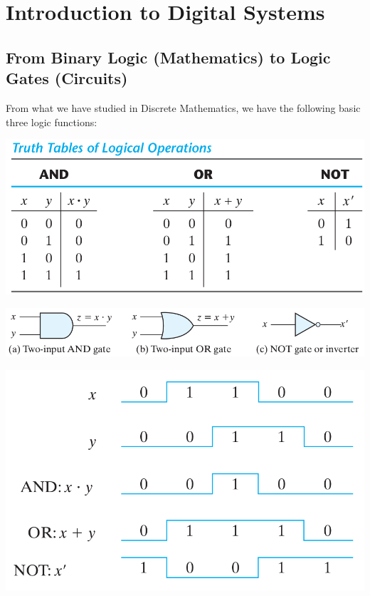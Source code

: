 \chapter{Introduction to Digital Systems}\label{cha:intr-digit-syst}

\setcounter{section}{8}

\clearpage

\section{From Binary Logic (Mathematics) to Logic Gates (Circuits)}\label{sec:from-binary-logic}

From what we have studied in Discrete Mathematics, we have the
following basic three logic functions:

\hfil\includegraphics[width=.7\textwidth]{../Graphics/Ch01Art29.png}\hfil

\clearpage

\hfil\includegraphics[width=\textwidth]{../Graphics/Ch01Art30b.png}\hfil

\clearpage

\hfil\includegraphics[width=\textwidth]{../Graphics/Ch01Art31a.png}\hfil

